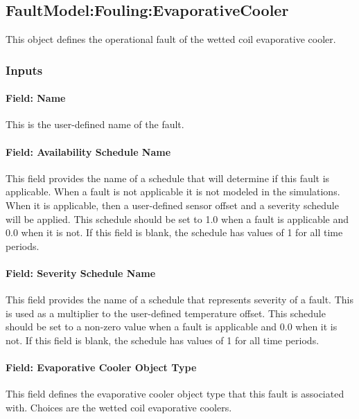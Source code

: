 \subsection{FaultModel:Fouling:EvaporativeCooler}\label{faultmodelfoulingevapcooler}

This object defines the operational fault of the wetted coil evaporative cooler.

\subsubsection{Inputs}

\paragraph{Field: Name}

This is the user-defined name of the fault.

\paragraph{Field: Availability Schedule Name}

This field provides the name of a schedule that will determine if this fault is applicable. When a fault is not applicable it is not modeled in the simulations. When it is applicable, then a user-defined sensor offset and a severity schedule will be applied. This schedule should be set to 1.0 when a fault is applicable and 0.0 when it is not. If this field is blank, the schedule has values of 1 for all time periods.

\paragraph{Field: Severity Schedule Name}\label{field-severity-schedule-name}

This field provides the name of a schedule that represents severity of a fault. This is used as a multiplier to the user-defined temperature offset. This schedule should be set to a non-zero value when a fault is applicable and 0.0 when it is not. If this field is blank, the schedule has values of 1 for all time periods.

\paragraph{Field: Evaporative Cooler Object Type}\label{field-evaporative cooler-object-type}

This field defines the evaporative cooler object type that this fault is associated with. Choices are the wetted coil evaporative coolers. 

